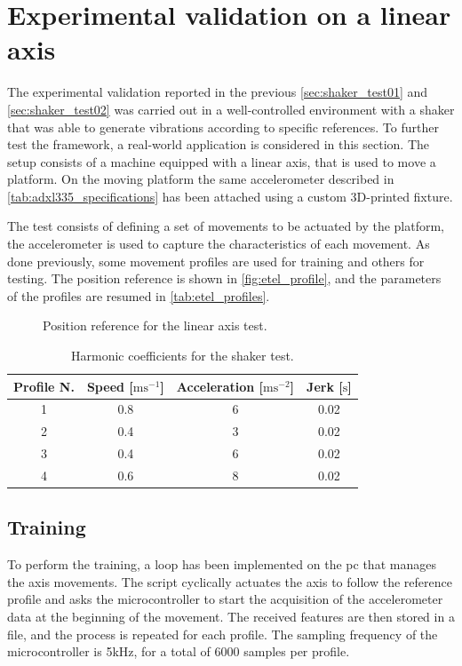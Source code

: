 \clearpage
\section{Experimental validation on a linear axis}
\label{sec:ExperimentalValidation}

The experimental validation reported in the previous \autoref{sec:shaker_test01} and \autoref{sec:shaker_test02} was carried out in a well-controlled environment with a shaker that was able to generate vibrations according to specific references. To further test the framework, a real-world application is considered in this section. The setup consists of a machine equipped with a linear axis, that is used to move a platform. On the moving platform the same accelerometer described in \autoref{tab:adxl335_specifications} has been attached using a custom 3D-printed fixture.

The test consists of defining a set of movements to be actuated by the platform, the accelerometer is used to capture the characteristics of each movement. As done previously, some movement profiles are used for training and others for testing. The position reference is shown in \autoref{fig:etel_profile}, and the parameters of the profiles are resumed in \autoref{tab:etel_profiles}.

\begin{figure}
    \centering
    \todo%
    \caption{Position reference for the linear axis test.}
    \label{fig:etel_profile}
\end{figure}

\begin{table}
    \centering
    \caption{Harmonic coefficients for the shaker test.}
    \label{tab:etel_profiles}
    \begin{tabular}{cccc} 
    \toprule
    \textbf{Profile N.} & \textbf{Speed} {[}$\text{m}\text{s}^{-1}$] & \textbf{Acceleration} {[}$\text{m}\text{s}^{-2}$] & \textbf{Jerk} {[}$\text{s}$] \\ 
    \hline
    1 & 0.8 & 6 & 0.02 \\
    2 & 0.4 & 3 & 0.02 \\
    3 & 0.4 & 6 & 0.02 \\
    4 & 0.6 & 8 & 0.02 \\
    \bottomrule
\end{tabular}
\end{table}

\subsection{Training}
To perform the training, a loop has been implemented on the \gls{pc} that manages the axis movements. The script cyclically actuates the axis to follow the reference profile and asks the microcontroller to start the acquisition of the accelerometer data at the beginning of the movement. The received features are then stored in a file, and the process is repeated for each profile. The sampling frequency of the microcontroller is 5kHz, for a total of 6000 samples per profile. 

